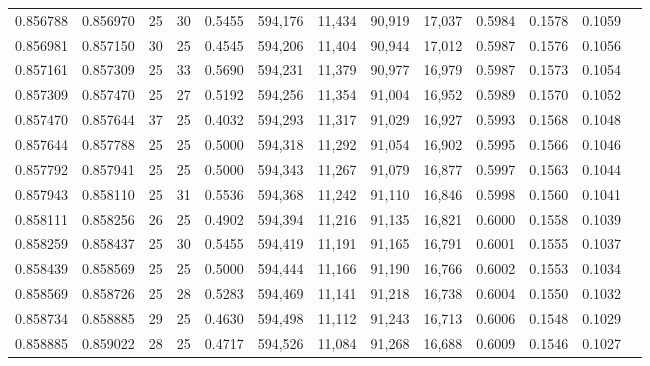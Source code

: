 \begin{tabular}{rrrrrrrrrrrrr}
0.856788 & 0.856970 &    25 &  30 &                                     0.5455 & 594,176 &  11,434 &  90,919 &  17,037 & 0.5984 & 0.1578 & 0.1059 \\
0.856981 & 0.857150 &    30 &  25 &                                     0.4545 & 594,206 &  11,404 &  90,944 &  17,012 & 0.5987 & 0.1576 & 0.1056 \\
0.857161 & 0.857309 &    25 &  33 &                                     0.5690 & 594,231 &  11,379 &  90,977 &  16,979 & 0.5987 & 0.1573 & 0.1054 \\
0.857309 & 0.857470 &    25 &  27 &                                     0.5192 & 594,256 &  11,354 &  91,004 &  16,952 & 0.5989 & 0.1570 & 0.1052 \\
0.857470 & 0.857644 &    37 &  25 &                                     0.4032 & 594,293 &  11,317 &  91,029 &  16,927 & 0.5993 & 0.1568 & 0.1048 \\
0.857644 & 0.857788 &    25 &  25 &                                     0.5000 & 594,318 &  11,292 &  91,054 &  16,902 & 0.5995 & 0.1566 & 0.1046 \\
0.857792 & 0.857941 &    25 &  25 &                                     0.5000 & 594,343 &  11,267 &  91,079 &  16,877 & 0.5997 & 0.1563 & 0.1044 \\
0.857943 & 0.858110 &    25 &  31 &                                     0.5536 & 594,368 &  11,242 &  91,110 &  16,846 & 0.5998 & 0.1560 & 0.1041 \\
0.858111 & 0.858256 &    26 &  25 &                                     0.4902 & 594,394 &  11,216 &  91,135 &  16,821 & 0.6000 & 0.1558 & 0.1039 \\
0.858259 & 0.858437 &    25 &  30 &                                     0.5455 & 594,419 &  11,191 &  91,165 &  16,791 & 0.6001 & 0.1555 & 0.1037 \\
0.858439 & 0.858569 &    25 &  25 &                                     0.5000 & 594,444 &  11,166 &  91,190 &  16,766 & 0.6002 & 0.1553 & 0.1034 \\
0.858569 & 0.858726 &    25 &  28 &                                     0.5283 & 594,469 &  11,141 &  91,218 &  16,738 & 0.6004 & 0.1550 & 0.1032 \\
0.858734 & 0.858885 &    29 &  25 &                                     0.4630 & 594,498 &  11,112 &  91,243 &  16,713 & 0.6006 & 0.1548 & 0.1029 \\
0.858885 & 0.859022 &    28 &  25 &                                     0.4717 & 594,526 &  11,084 &  91,268 &  16,688 & 0.6009 & 0.1546 & 0.1027 \\

\end{tabular}
